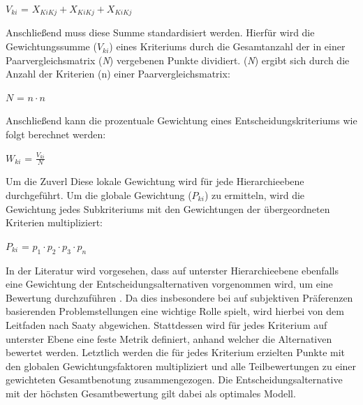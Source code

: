  \vspace{-6mm}
 \begin{center}
	$V_{ki}$ = $X_{KiKj}+X_{KiKj}+X_{KiKj}$	
 \end{center}
Anschließend muss diese Summe standardisiert werden. Hierfür wird die Gewichtungssumme ($V_{ki}$) eines Kriteriums durch die Gesamtanzahl der in einer Paarvergleichsmatrix (\textit{N}) vergebenen Punkte dividiert. (\textit{N}) ergibt sich durch die Anzahl der Kriterien (n) einer Paarvergleichsmatrix:
\vspace{-2mm}
\begin{center}
   $N$ = $ n \cdot n $	
\end{center}
Anschließend kann die prozentuale Gewichtung eines Entscheidungskriteriums wie folgt berechnet werden:
 \vspace{-2mm}
 \begin{center}
	$W_{ki}$ = $\frac{V_{ki}}{N}$	
 \end{center}
Um die Zuverl
Diese lokale Gewichtung wird für jede Hierarchieebene durchgeführt. Um die globale Gewichtung ($P_{ki}$) zu ermitteln, wird die Gewichtung jedes Subkriteriums mit den Gewichtungen der übergeordneten Kriterien  multipliziert:
\vspace{-2mm}
 \begin{center}
	$P_{ki}$ = $p_{1} \cdot p_{2} \cdot p_{3} \cdot p_{n} $	
 \end{center}
In der Literatur wird vorgesehen, dass auf unterster Hierarchieebene ebenfalls eine Gewichtung der Entscheidungsalternativen vorgenommen wird, um eine Bewertung durchzuführen \cite[86]{Saaty.2008}. Da dies insbesondere bei auf subjektiven Präferenzen basierenden Problemstellungen eine wichtige Rolle spielt, wird hierbei von dem Leitfaden nach Saaty abgewichen. Stattdessen wird für jedes Kriterium auf unterster Ebene eine feste Metrik definiert, anhand welcher die Alternativen bewertet werden. Letztlich werden die für jedes Kriterium erzielten Punkte mit den globalen Gewichtungsfaktoren multipliziert und alle Teilbewertungen zu einer gewichteten Gesamtbenotung zusammengezogen. Die Entscheidungsalternative mit der höchsten Gesamtbewertung gilt dabei als optimales Modell. 
